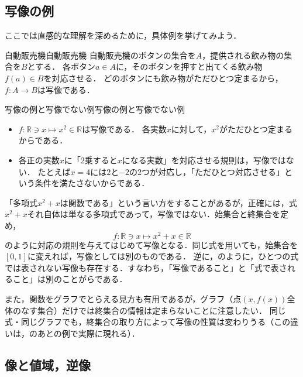 \subsection{写像の例}

ここでは直感的な理解を深めるために，具体例を挙げてみよう．

\begin{example}{自動販売機}{自動販売機}
  自動販売機のボタンの集合を$A$，提供される飲み物の集合を$B$とする．
  各ボタン$a \in A$に，そのボタンを押すと出てくる飲み物$f(a) \in B$を対応させる．
  どのボタンにも飲み物がただひとつ定まるから，$f \colon A \to B$は写像である．
\end{example}

\begin{example}{写像の例と写像でない例}{写像の例と写像でない例}
  \begin{itemize}
    \item $f \colon \mathbb{R} \ni x \mapsto x^2 \in \mathbb{R}$は写像である．
          各実数$x$に対して，$x^2$がただひとつ定まるからである．
    \item 各正の実数$x$に「2乗すると$x$になる実数」を対応させる規則は，写像ではない．
          たとえば$x = 4$には$2$と$-2$の2つが対応し，「ただひとつ対応させる」という条件を満たさないからである．
  \end{itemize}
\end{example}

\begin{remark}[「式」と「写像」の違い]
  「多項式$x^2 + x$は関数である」という言い方をすることがあるが，正確には，式$x^2 + x$それ自体は単なる多項式であって，写像ではない．始集合と終集合を定め，
  \[
    f \colon \mathbb{R} \ni x \mapsto x^2 + x \in \mathbb{R}
  \]
  のように対応の規則を与えてはじめて写像となる．同じ式を用いても，始集合を$[0, 1]$に変えれば，写像としては別のものである．
  逆に，のように，ひとつの式では表されない写像も存在する．すなわち，「写像であること」と「式で表されること」は別のことがらである．

  また，関数をグラフでとらえる見方も有用であるが，グラフ（点$(x, f(x))$全体のなす集合）だけでは終集合の情報は定まらないことに注意したい．
  同じ式・同じグラフでも，終集合の取り方によって写像の性質は変わりうる（この違いは，のあとの例で実際に現れる）．
\end{remark}


\subsection{像と値域，逆像}

